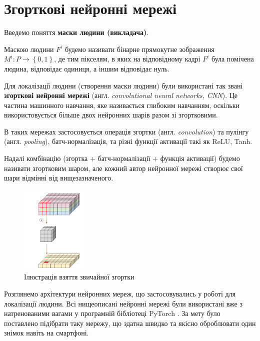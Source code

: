 \section{Згорткові нейронні мережі}

Введемо поняття \textbf{маски людини (викладача)}.

Маскою людини \(F^{i}\) будемо називати бінарне прямокутне
зображення \(M^{i}:P \rightarrow \left\{ 0,1 \right\}\), де тим
пікселям, в яких на відповідному кадрі \(F^{i}\) була помічена людина,
відповідає одиниця, а іншим відповідає нуль.


Для локалізації людини (створення маски людини) були використані так звані
\textbf{згорткові нейронні мережі} (англ. \textit{convolutional neural networks, CNN}).
Це частина машинного навчання, яке називається глибоким навчанням, оскільки використовується
більше двох нейронних шарів разом зі згортковими.

В таких мережах застосовується операція згортки (англ. \textit{convolution})
та пулінгу (англ. \textit{pooling}), батч-нормалізація, та різні функції
активації такі як ReLU, Tanh.

Надалі комбінацію (згортка + батч-нормалізації + функція активації)
будемо називати згортковим шаром, але кожний автор нейронної мережі
створює свої шари відмінні від вищезазначеного.

\begin{figure}[H]
    \centering
    \includegraphics[width=0.3\textwidth]{images/cnn_conv_operation}
    \caption{Ілюстрація взяття звичайної згортки  \cite{deep_wise_sep_conv_website}
        \label{fig:cnn:conv_operation}
    }
\end{figure}

Розглянемо архітектури нейронних мереж, що застосовувались у роботі
для локалізації людини. Всі нищеописані нейронні мережі були використані вже з
натренованими вагами у програмній бібліотеці PyTorch \cite{pytorch_library}.
За мету було поставлено підібрати таку мережу, що здатна швидко та якісно оброблювати
один знімок навіть на смартфоні.

